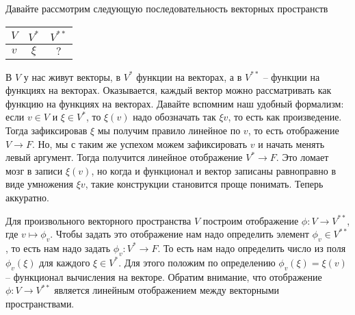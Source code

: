 Давайте рассмотрим следующую последовательность векторных пространств
\begin{center}
\begin{tabular}{c|c|c}

{$V$}&{$V^*$}&{$V^{**}$}\\

\hline

{$v$}&{$\xi$}&{$?$}\\

\end{tabular}
\end{center}
В $V$ у нас живут векторы, в $V^*$ функции на векторах, а в $V^{**}$ -- функции на функциях на векторах. Оказывается, каждый вектор можно рассматривать как функцию на функциях на векторах. Давайте вспомним наш удобный формализм: если $v\in V$ и $\xi \in V^*$, то $\xi(v)$ надо обозначать так $\xi v$, то есть как произведение. Тогда зафиксировав $\xi$ мы получим правило линейное по $v$, то есть отображение $V\to F$. Но, мы с таким же успехом можем зафиксировать $v$ и начать менять левый аргумент. Тогда получится линейное отображение $V^* \to F$. Это ломает мозг в записи $\xi(v)$, но когда и функционал и вектор записаны равноправно в виде умножения $\xi v$, такие конструкции становится проще понимать. Теперь аккуратно.

Для произвольного векторного пространства $V$ построим отображение $\phi\colon V\to V^{**}$, где $v\mapsto \phi_v$. Чтобы задать это отображение нам надо определить элемент $\phi_v\in V^{**}$, то есть нам надо задать $\phi_v\colon V^*\to F$. То есть нам надо определить число из поля $\phi_v(\xi)$ для каждого $\xi\in V^*$. Для этого положим по определению $\phi_v(\xi) = \xi(v)$ -- функционал вычисления на векторе. Обратим внимание, что отображение $\phi\colon V\to V^{**}$ является линейным отображением между векторными пространствами.

